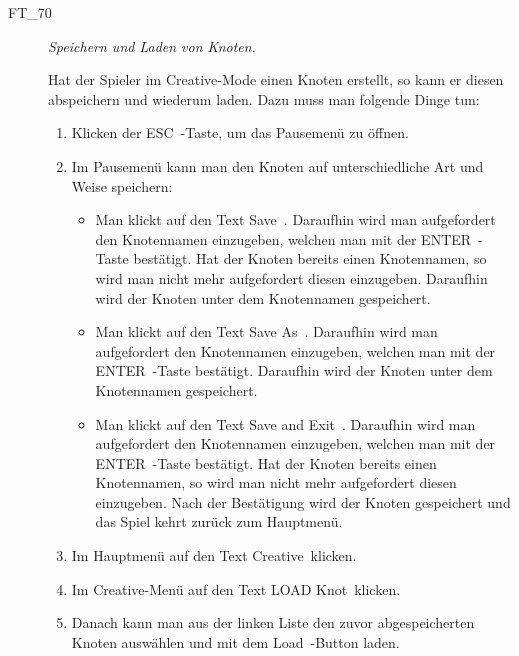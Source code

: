 \begin{description}
\begin{enumerate}
		
	\end{enumerate}
	

	\item[FT\_70] \textit{Speichern und Laden von Knoten.} \hfill\\
	
	\label{FT:70}
	
	Hat der Spieler im Creative-Mode einen Knoten erstellt, so kann er diesen abspeichern und wiederum laden. Dazu muss man folgende Dinge tun:
	
		\begin{enumerate} 
	
		\item  Klicken der \glqq ESC\grqq~-Taste, um das Pausemenü zu öffnen.
		\item Im Pausemenü kann man den Knoten auf unterschiedliche Art und Weise speichern:
		 
		\begin{itemize} 
        \item Man klickt auf den Text \glqq Save\grqq~. Daraufhin wird man aufgefordert den Knotennamen einzugeben, welchen man mit der \glqq ENTER\grqq~-Taste bestätigt. Hat der Knoten bereits einen Knotennamen, so wird man nicht mehr aufgefordert diesen einzugeben. Daraufhin wird der Knoten unter dem Knotennamen gespeichert.
        \item Man klickt auf den Text \glqq Save As\grqq~. Daraufhin wird man aufgefordert den Knotennamen einzugeben, welchen man mit der \glqq ENTER\grqq~-Taste bestätigt. Daraufhin wird der Knoten unter dem Knotennamen gespeichert.
        \item Man klickt auf den Text \glqq Save and Exit\grqq~. Daraufhin wird man aufgefordert den Knotennamen einzugeben, welchen man mit der \glqq ENTER\grqq~-Taste bestätigt. Hat der Knoten bereits einen Knotennamen, so wird man nicht mehr aufgefordert diesen einzugeben. Nach der Bestätigung wird der Knoten gespeichert und das Spiel kehrt zurück zum Hauptmenü.	
		
		\end{itemize}
		
		\item Im Hauptmenü auf den Text \glqq Creative\grqq~klicken.
		\item Im Creative-Menü auf den Text \glqq LOAD Knot\grqq~klicken.
		\item Danach kann man aus der linken Liste den zuvor abgespeicherten Knoten auswählen und mit dem \glqq Load\grqq~-Button laden.
		
	\end{enumerate}
	

\end{description}
